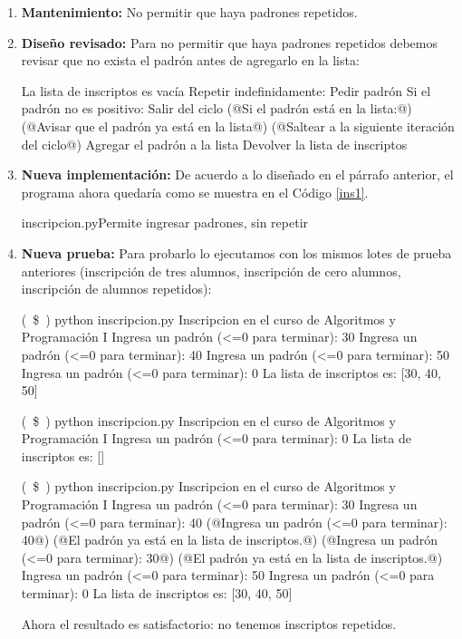 \begin{enumerate}
Evidentemente el programa funciona de acuerdo a lo especificado, pero
hay algo que no tuvimos en cuenta: permite inscribir a una misma persona
más de una vez.

\item {\bf Mantenimiento:} No permitir que haya padrones repetidos.

\item {\bf Diseño revisado:} Para no permitir que haya padrones repetidos
debemos revisar que no exista el padrón antes de agregarlo en la lista:

\begin{codigo-nohl-sn}
La lista de inscriptos es vacía
Repetir indefinidamente:
    Pedir padrón
    Si el padrón no es positivo:
        Salir del ciclo
    (@Si el padrón está en la lista:@)
        (@Avisar que el padrón ya está en la lista@)
        (@Saltear a la siguiente iteración del ciclo@)
    Agregar el padrón a la lista
Devolver la lista de inscriptos
\end{codigo-nohl-sn}

\item {\bf Nueva implementación:}
De acuerdo a lo diseñado en el párrafo anterior, el programa ahora quedaría
como se muestra en el Código \ref{ins1}.

\begin{codigo}{inscripcion.py}{Permite ingresar padrones, sin repetir}
\label{ins1}

\end{codigo}

\item {\bf Nueva prueba:}
Para probarlo lo ejecutamos con los mismos lotes de prueba anteriores
(inscripción de tres alumnos, inscripción de cero alumnos, inscripción de
alumnos repetidos):

\begin{codigo-nohl-sn}
(~\$~) python inscripcion.py
Inscripcion en el curso de Algoritmos y Programación I
Ingresa un padrón (<=0 para terminar): 30
Ingresa un padrón (<=0 para terminar): 40
Ingresa un padrón (<=0 para terminar): 50
Ingresa un padrón (<=0 para terminar): 0
La lista de inscriptos es: [30, 40, 50]

(~\$~) python inscripcion.py
Inscripcion en el curso de Algoritmos y Programación I
Ingresa un padrón (<=0 para terminar): 0
La lista de inscriptos es: []

(~\$~) python inscripcion.py
Inscripcion en el curso de Algoritmos y Programación I
Ingresa un padrón (<=0 para terminar): 30
Ingresa un padrón (<=0 para terminar): 40
(@Ingresa un padrón (<=0 para terminar): 40@)
(@El padrón ya está en la lista de inscriptos.@)
(@Ingresa un padrón (<=0 para terminar): 30@)
(@El padrón ya está en la lista de inscriptos.@)
Ingresa un padrón (<=0 para terminar): 50
Ingresa un padrón (<=0 para terminar): 0
La lista de inscriptos es: [30, 40, 50]
\end{codigo-nohl-sn}

Ahora el resultado es satisfactorio: no tenemos inscriptos repetidos.

\end{enumerate}

